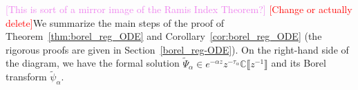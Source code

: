 \documentclass{article}
\newcommand{\C}{\mathbb{C}}
\newcommand{\series}[1]{\tilde{#1}}
\newcommand{\laplace}{\mathcal{L}}
\newcommand{\borel}{\mathcal{B}}
\theoremstyle{definition}
\theoremstyle{plain}
\newtheorem{theorem}{Theorem}[section]
\newtheorem{corollary}[theorem]{Corollary}
\begin{document}
\color{black}
\textcolor{Violet}{[This is sort of a mirror image of the Ramis Index Theorem?]}
%
\textcolor{red}{[Change or actually delete]}We summarize the main steps of the proof of Theorem~\ref{thm:borel_reg_ODE} and Corollary~\ref{cor:borel_reg_ODE} (the rigorous proofs are given in Section~\ref{borel_reg-ODE}). On the right-hand side of the diagram, we have the formal solution $\series{\Psi }_\alpha\in e^{-\alpha z}z^{-\tau_\alpha}\C\llbracket z^{-1}\rrbracket$ and its Borel transform $\series{\psi}_\alpha$. %

\begin{center}
\end{center} 
\end{document}
